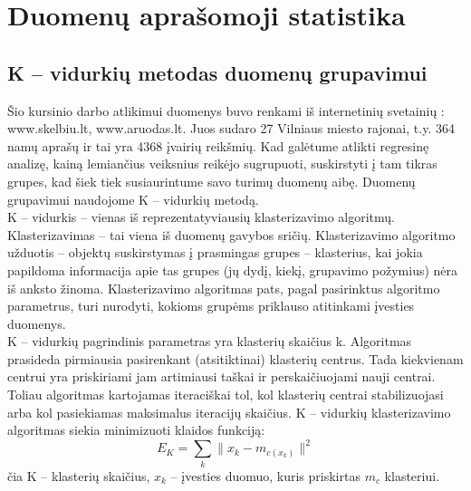 \documentclass[a4paper]{article}
\begin{document}
\section{Duomenų aprašomoji statistika}
\subsection{K -- vidurkių metodas duomenų grupavimui}
\hspace*{0,52cm}Šio kursinio darbo atlikimui duomenys buvo renkami iš internetinių svetainių : www.skelbiu.lt, www.aruodas.lt. Juos sudaro 27 Vilniaus miesto rajonai, t.y. 364 namų aprašų ir tai yra 4368 įvairių reikšmių. Kad galėtume atlikti regresinę analizę, kainą lemiančius veiksnius reikėjo sugrupuoti, suskirstyti į tam tikras grupes, kad šiek tiek susiaurintume savo turimų duomenų aibę. Duomenų grupavimui naudojome K -- vidurkių metodą.\\
\hspace*{0,52cm}K -- vidurkis -- vienas iš reprezentatyviausių klasterizavimo algoritmų. Klasterizavimas -- tai viena iš duomenų gavybos sričių. Klasterizavimo algoritmo užduotis -- objektų suskirstymas į prasmingas grupes -- klasterius, kai jokia papildoma informacija apie tas grupes (jų dydį, kiekį, grupavimo požymius) nėra iš anksto žinoma. Klasterizavimo algoritmas pats, pagal pasirinktus algoritmo parametrus, turi nurodyti, kokioms grupėms priklauso atitinkami įvesties duomenys.\\
\hspace*{0,52cm}K -- vidurkių pagrindinis parametras yra klasterių skaičius k. Algoritmas prasideda pirmiausia pasirenkant (atsitiktinai) klasterių centrus. Tada kiekvienam centrui yra priskiriami jam artimiausi taškai ir perskaičiuojami nauji centrai. Toliau algoritmas kartojamas iteraciškai tol, kol klasterių centrai stabilizuojasi arba kol pasiekiamas maksimalus iteracijų skaičius. K -- vidurkių klasterizavimo algoritmas siekia minimizuoti klaidos funkciją:\\
\begin{equation}
E_K=\sum_{k}\parallel x_k-m_{c(x_k)}\parallel ^{2} 
\end{equation}
čia K -- klasterių skaičius, $x_k$ -- įvesties duomuo, kuris priskirtas $m_c$ klasteriui.
\end{document}
